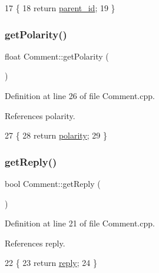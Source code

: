\begin{DoxyCode}
17 \{
18     \textcolor{keywordflow}{return} \hyperlink{class_comment_abc88c0f64df05cb3d29ad1c7aa1621c5}{parent\_id};
19 \}
\end{DoxyCode}
\mbox{\label{class_comment_ab8f639d0d25165885bfbf09d3469f2b0}} 
\subsubsection{\texorpdfstring{get\+Polarity()}{getPolarity()}}
{\footnotesize\ttfamily float Comment\+::get\+Polarity (\begin{DoxyParamCaption}{ }\end{DoxyParamCaption})}



Definition at line 26 of file Comment.\+cpp.



References polarity.


\begin{DoxyCode}
27 \{
28     \textcolor{keywordflow}{return} \hyperlink{class_comment_a617b67425b39c1f5f1eb0ada3d4bbd74}{polarity};
29 \}
\end{DoxyCode}
\mbox{\label{class_comment_a89cfdb81dd327cf01d4f0fbb1d6f3c44}} 
\subsubsection{\texorpdfstring{get\+Reply()}{getReply()}}
{\footnotesize\ttfamily bool Comment\+::get\+Reply (\begin{DoxyParamCaption}{ }\end{DoxyParamCaption})}



Definition at line 21 of file Comment.\+cpp.



References reply.


\begin{DoxyCode}
22 \{
23     \textcolor{keywordflow}{return} \hyperlink{class_comment_a7b8ceeb67364d5e08299baeeff38ba03}{reply};
24 \}
\end{DoxyCode}
\mbox{\label{class_comment_a192b820f7ad3d8065437436eae4408c5}} 
